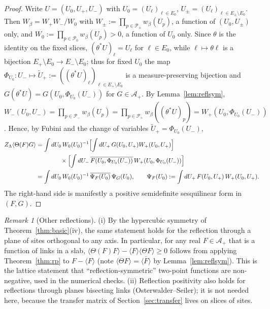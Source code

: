 \documentclass[11pt,a4paper]{article}
\theoremstyle{definition}
\theoremstyle{remark}
\newtheorem{remark}[theorem]{Remark}
\newcommand{\cA}{\mathcal{A}}
\newcommand{\cP}{\mathcal{P}}
\begin{document}
\begin{proof}
Write $U=(U_0,U_+,U_-)$ with $U_0=(U_\ell)_{\ell\in E_0}$, $U_\pm=(U_\ell)_{\ell\in E_\pm\setminus E_0}$. Then
$W_\beta=W_+W_-/W_0$ with $W_\pm:=\prod_{p\in\cP_\pm}w_\beta(U_p)$, a function of $(U_0,U_\pm)$ only, and
$W_0:=\prod_{p\in\cP_0}w_\beta(U_p)>0$, a function of $U_0$ only. Since $\theta$ is the identity on the fixed
slices, $(\theta^*U)_\ell=U_\ell$ for $\ell\in E_0$, while $\ell\mapsto\theta\ell$ is a bijection
$E_+\setminus E_0\to E_-\setminus E_0$; thus for fixed $U_0$ the map $\Phi_{U_0}:U_-\mapsto\tilde U_+:=((\theta^*U)_\ell)_{\ell\in E_+\setminus E_0}$
is a measure-preserving bijection and $G(\theta^*U)=G(U_0,\Phi_{U_0}(U_-))$ for $G\in\cA_+$. By
Lemma~\ref{lem:reflsym}, $W_-(U_0,U_-)=\prod_{p\in\cP_-}w_\beta(U_p)=\prod_{p\in\cP_+}w_\beta((\theta^*U)_p)=W_+(U_0,\Phi_{U_0}(U_-))$.
Hence, by Fubini and the change of variables $\tilde U_+=\Phi_{U_0}(U_-)$,
\begin{align*}
Z_\Lambda\langle\Theta(F)G\rangle
&=\int dU_0\,W_0(U_0)^{-1}\Bigl[\int dU_+\,G(U_0,U_+)W_+(U_0,U_+)\Bigr]\\
&\qquad\qquad\times\Bigl[\int dU_-\,\overline{F(U_0,\Phi_{U_0}(U_-))}\,W_+(U_0,\Phi_{U_0}(U_-))\Bigr]\\
&=\int dU_0\,W_0(U_0)^{-1}\,\overline{\Psi_F(U_0)}\,\Psi_G(U_0),\qquad
\Psi_F(U_0):=\int dU_+\,F(U_0,U_+)\,W_+(U_0,U_+).
\end{align*}
The right-hand side is manifestly a positive semidefinite sesquilinear form in $(F,G)$.
\end{proof}

\begin{remark}[Other reflections]
(i) By the hypercubic symmetry of Theorem~\ref{thm:basic}(iv), the same statement holds for the reflection
through a plane of sites orthogonal to any axis. In particular, for any real $F\in\cA_+$ that is a function of
links in a slab, $\langle\Theta(F)F\rangle-\langle F\rangle\langle\Theta F\rangle\ge0$ follows from applying
Theorem~\ref{thm:rp} to $F-\langle F\rangle$ (note $\langle\Theta F\rangle=\overline{\langle F\rangle}$ by
Lemma~\ref{lem:reflsym}). This is the lattice statement that ``reflection-symmetric'' two-point functions are
non-negative, used in the numerical checks. (ii) Reflection positivity also holds for reflections through planes
bisecting links (Osterwalder--Seiler); it is not needed here, because the transfer matrix of
Section~\ref{sec:transfer} lives on slices of sites.
\end{remark}
\end{document}
